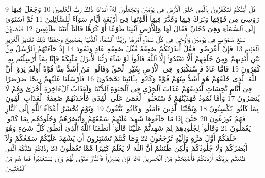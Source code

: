 {\tiny\colorbox{cl_aya}{9}} قُلْ أَئِنَّكُمْ لَتَكْفُرُونَ بِٱلَّذِى خَلَقَ ٱلْأَرْضَ فِى يَوْمَيْنِ وَتَجْعَلُونَ لَهُۥٓ أَندَادًا ذَٰلِكَ رَبُّ ٱلْعَٰلَمِينَ
{\tiny\colorbox{cl_aya}{10}} وَجَعَلَ فِيهَا رَوَٰسِىَ مِن فَوْقِهَا وَبَٰرَكَ فِيهَا وَقَدَّرَ فِيهَآ أَقْوَٰتَهَا فِىٓ أَرْبَعَةِ أَيَّامٍ سَوَآءً لِّلسَّآئِلِينَ
{\tiny\colorbox{cl_aya}{11}} ثُمَّ ٱسْتَوَىٰٓ إِلَى ٱلسَّمَآءِ وَهِىَ دُخَانٌ فَقَالَ لَهَا وَلِلْأَرْضِ ٱئْتِيَا طَوْعًا أَوْ كَرْهًا قَالَتَآ أَتَيْنَا طَآئِعِينَ
{\tiny\colorbox{cl_aya}{12}} فَقَضَىٰهُنَّ سَبْعَ سَمَٰوَاتٍ فِى يَوْمَيْنِ وَأَوْحَىٰ فِى كُلِّ سَمَآءٍ أَمْرَهَا وَزَيَّنَّا ٱلسَّمَآءَ ٱلدُّنْيَا بِمَصَٰبِيحَ وَحِفْظًا ذَٰلِكَ تَقْدِيرُ ٱلْعَزِيزِ ٱلْعَلِيمِ
{\tiny\colorbox{cl_aya}{13}} فَإِنْ أَعْرَضُوا۟ فَقُلْ أَنذَرْتُكُمْ صَٰعِقَةً مِّثْلَ صَٰعِقَةِ عَادٍ وَثَمُودَ
{\tiny\colorbox{cl_aya}{14}} إِذْ جَآءَتْهُمُ ٱلرُّسُلُ مِنۢ بَيْنِ أَيْدِيهِمْ وَمِنْ خَلْفِهِمْ أَلَّا تَعْبُدُوٓا۟ إِلَّا ٱللَّهَ قَالُوا۟ لَوْ شَآءَ رَبُّنَا لَأَنزَلَ مَلَٰٓئِكَةً فَإِنَّا بِمَآ أُرْسِلْتُم بِهِۦ كَٰفِرُونَ
{\tiny\colorbox{cl_aya}{15}} فَأَمَّا عَادٌ فَٱسْتَكْبَرُوا۟ فِى ٱلْأَرْضِ بِغَيْرِ ٱلْحَقِّ وَقَالُوا۟ مَنْ أَشَدُّ مِنَّا قُوَّةً أَوَلَمْ يَرَوْا۟ أَنَّ ٱللَّهَ ٱلَّذِى خَلَقَهُمْ هُوَ أَشَدُّ مِنْهُمْ قُوَّةً وَكَانُوا۟ بِـَٔايَٰتِنَا يَجْحَدُونَ
{\tiny\colorbox{cl_aya}{16}} فَأَرْسَلْنَا عَلَيْهِمْ رِيحًا صَرْصَرًا فِىٓ أَيَّامٍ نَّحِسَاتٍ لِّنُذِيقَهُمْ عَذَابَ ٱلْخِزْىِ فِى ٱلْحَيَوٰةِ ٱلدُّنْيَا وَلَعَذَابُ ٱلْءَاخِرَةِ أَخْزَىٰ وَهُمْ لَا يُنصَرُونَ
{\tiny\colorbox{cl_aya}{17}} وَأَمَّا ثَمُودُ فَهَدَيْنَٰهُمْ فَٱسْتَحَبُّوا۟ ٱلْعَمَىٰ عَلَى ٱلْهُدَىٰ فَأَخَذَتْهُمْ صَٰعِقَةُ ٱلْعَذَابِ ٱلْهُونِ بِمَا كَانُوا۟ يَكْسِبُونَ
{\tiny\colorbox{cl_aya}{18}} وَنَجَّيْنَا ٱلَّذِينَ ءَامَنُوا۟ وَكَانُوا۟ يَتَّقُونَ
{\tiny\colorbox{cl_aya}{19}} وَيَوْمَ يُحْشَرُ أَعْدَآءُ ٱللَّهِ إِلَى ٱلنَّارِ فَهُمْ يُوزَعُونَ
{\tiny\colorbox{cl_aya}{20}} حَتَّىٰٓ إِذَا مَا جَآءُوهَا شَهِدَ عَلَيْهِمْ سَمْعُهُمْ وَأَبْصَٰرُهُمْ وَجُلُودُهُم بِمَا كَانُوا۟ يَعْمَلُونَ
{\tiny\colorbox{cl_aya}{21}} وَقَالُوا۟ لِجُلُودِهِمْ لِمَ شَهِدتُّمْ عَلَيْنَا قَالُوٓا۟ أَنطَقَنَا ٱللَّهُ ٱلَّذِىٓ أَنطَقَ كُلَّ شَىْءٍ وَهُوَ خَلَقَكُمْ أَوَّلَ مَرَّةٍ وَإِلَيْهِ تُرْجَعُونَ
{\tiny\colorbox{cl_aya}{22}} وَمَا كُنتُمْ تَسْتَتِرُونَ أَن يَشْهَدَ عَلَيْكُمْ سَمْعُكُمْ وَلَآ أَبْصَٰرُكُمْ وَلَا جُلُودُكُمْ وَلَٰكِن ظَنَنتُمْ أَنَّ ٱللَّهَ لَا يَعْلَمُ كَثِيرًا مِّمَّا تَعْمَلُونَ
{\tiny\colorbox{cl_aya}{23}} وَذَٰلِكُمْ ظَنُّكُمُ ٱلَّذِى ظَنَنتُم بِرَبِّكُمْ أَرْدَىٰكُمْ فَأَصْبَحْتُم مِّنَ ٱلْخَٰسِرِينَ
{\tiny\colorbox{cl_aya}{24}} فَإِن يَصْبِرُوا۟ فَٱلنَّارُ مَثْوًى لَّهُمْ وَإِن يَسْتَعْتِبُوا۟ فَمَا هُم مِّنَ ٱلْمُعْتَبِينَ

